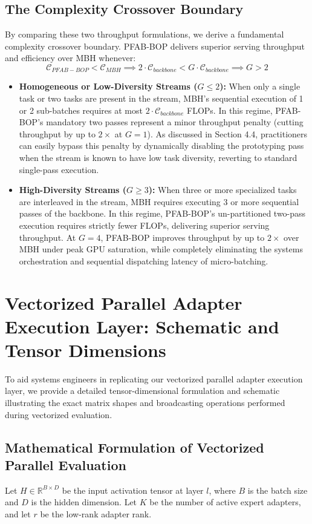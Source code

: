 \documentclass{article}
\theoremstyle{plain}
\theoremstyle{definition}
\theoremstyle{remark}
\begin{document}
\subsection{The Complexity Crossover Boundary}
By comparing these two throughput formulations, we derive a fundamental complexity crossover boundary. PFAB-BOP delivers superior serving throughput and efficiency over MBH whenever:
\begin{equation}
  \mathcal{C}_{PFAB-BOP} < \mathcal{C}_{MBH} \implies 2 \cdot \mathcal{C}_{backbone} < G \cdot \mathcal{C}_{backbone} \implies G > 2
\end{equation}
\begin{itemize}
  \item \textbf{Homogeneous or Low-Diversity Streams ($G \le 2$):} When only a single task or two tasks are present in the stream, MBH's sequential execution of 1 or 2 sub-batches requires at most $2 \cdot \mathcal{C}_{backbone}$ FLOPs. In this regime, PFAB-BOP's mandatory two passes represent a minor throughput penalty (cutting throughput by up to $2\times$ at $G=1$). As discussed in Section 4.4, practitioners can easily bypass this penalty by dynamically disabling the prototyping pass when the stream is known to have low task diversity, reverting to standard single-pass execution.
  \item \textbf{High-Diversity Streams ($G \ge 3$):} When three or more specialized tasks are interleaved in the stream, MBH requires executing 3 or more sequential passes of the backbone. In this regime, PFAB-BOP's un-partitioned two-pass execution requires strictly fewer FLOPs, delivering superior serving throughput. At $G=4$, PFAB-BOP improves throughput by up to $2\times$ over MBH under peak GPU saturation, while completely eliminating the systems orchestration and sequential dispatching latency of micro-batching.
\end{itemize}

\section{Vectorized Parallel Adapter Execution Layer: Schematic and Tensor Dimensions}
\label{app:vectorization}

To aid systems engineers in replicating our vectorized parallel adapter execution layer, we provide a detailed tensor-dimensional formulation and schematic illustrating the exact matrix shapes and broadcasting operations performed during vectorized evaluation.

\subsection{Mathematical Formulation of Vectorized Parallel Evaluation}
Let $H \in \mathbb{R}^{B \times D}$ be the input activation tensor at layer $l$, where $B$ is the batch size and $D$ is the hidden dimension. Let $K$ be the number of active expert adapters, and let $r$ be the low-rank adapter rank.
\end{document}
